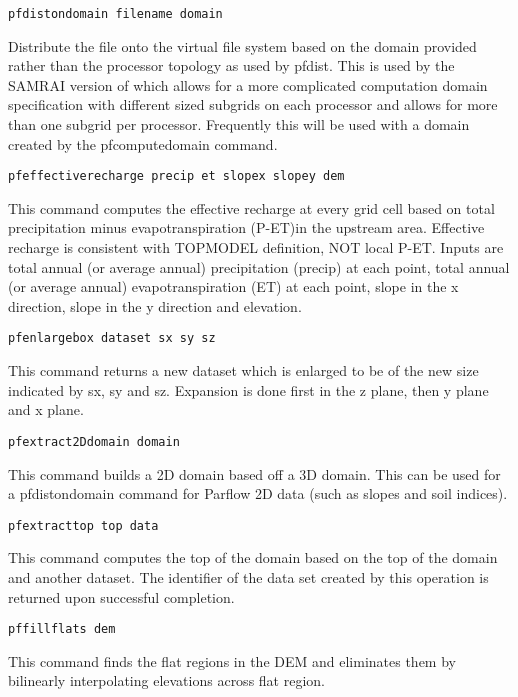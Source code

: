 \begin{description}
\item{\begin{verbatim}pfdistondomain filename domain\end{verbatim}}
 Distribute the file onto the virtual file system based on the domain
 provided rather than the processor topology as used by pfdist.  This
 is used by the SAMRAI version of which allows for a more complicated
 computation domain specification with different sized subgrids on
 each processor and allows for more than one subgrid per processor.
  Frequently this will be used with a domain created by the
 pfcomputedomain command.   


\item{\begin{verbatim}pfeffectiverecharge precip et slopex slopey dem\end{verbatim}}
This command computes the effective recharge at every grid cell based on total precipitation
minus evapotranspiration (P-ET)in the upstream area. Effective recharge is consistent with TOPMODEL
definition, NOT local P-ET.   Inputs are total annual (or average annual) precipitation (precip) at each point, 
total annual (or average annual) evapotranspiration (ET) at each point, slope in the x
direction, slope in the y direction and elevation. 

\item{\begin{verbatim}pfenlargebox dataset sx sy sz\end{verbatim}}
This command returns a new dataset which is enlarged to be of the
new size indicated by sx, sy and sz. Expansion is done first in the 
z plane, then y plane and x plane. 

\item{\begin{verbatim}pfextract2Ddomain domain\end{verbatim}} This
 command builds a 2D domain based off a 3D domain.  This can be used
 for a pfdistondomain command for Parflow 2D data (such as slopes and
 soil indices).

\item{\begin{verbatim}pfextracttop top data\end{verbatim}} 
This command computes the top of the domain based on the top of the
 domain and another dataset.  The identifier of the data set created
 by this operation is returned upon successful completion.

\item{\begin{verbatim}pffillflats dem\end{verbatim}} 
This command finds the flat regions in the DEM and eliminates them by 
bilinearly interpolating elevations across flat region.


\end{description}
